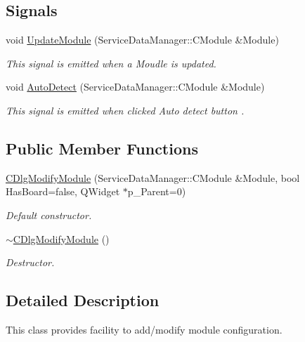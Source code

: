 \subsection*{\-Signals}
\begin{DoxyCompactItemize}
\item 
void \hyperlink{classSystemTracking_1_1CDlgModifyModule_aface0e32e5b10664dce01d65fdf6b459}{\-Update\-Module} (\-Service\-Data\-Manager\-::\-C\-Module \&\-Module)
\begin{DoxyCompactList}\small\item\em \-This signal is emitted when a \-Moudle is updated. \end{DoxyCompactList}\item 
void \hyperlink{classSystemTracking_1_1CDlgModifyModule_ad989c8b1904a0248ddaef66459a23f96}{\-Auto\-Detect} (\-Service\-Data\-Manager\-::\-C\-Module \&\-Module)
\begin{DoxyCompactList}\small\item\em \-This signal is emitted when clicked \-Auto detect button . \end{DoxyCompactList}\end{DoxyCompactItemize}
\subsection*{\-Public \-Member \-Functions}
\begin{DoxyCompactItemize}
\item 
\hyperlink{classSystemTracking_1_1CDlgModifyModule_ac746c8efea735712323d23e010b2b06e}{\-C\-Dlg\-Modify\-Module} (\-Service\-Data\-Manager\-::\-C\-Module \&\-Module, bool \-Has\-Board=false, \-Q\-Widget $\ast$p\-\_\-\-Parent=0)
\begin{DoxyCompactList}\small\item\em \-Default constructor. \end{DoxyCompactList}\item 
\hyperlink{classSystemTracking_1_1CDlgModifyModule_a12eae58c86111dcab860ccc2b562bafc}{$\sim$\-C\-Dlg\-Modify\-Module} ()
\begin{DoxyCompactList}\small\item\em \-Destructor. \end{DoxyCompactList}\end{DoxyCompactItemize}


\subsection{\-Detailed \-Description}
\-This class provides facility to add/modify module configuration. 

